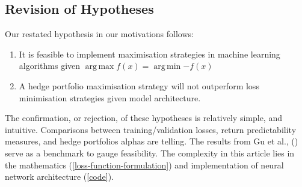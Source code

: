 \documentclass[12pt]{article}
\DeclareMathOperator*{\argmax}{arg\,max}
\DeclareMathOperator*{\argmin}{arg\,min} %
\begin{document}
\subsection{Revision of Hypotheses}
Our restated hypothesis in our motivations follows:
\singlespacing
\begin{enumerate}
	\item It is feasible to implement maximisation strategies in machine learning algorithms given $\argmax{f(x)}=\argmin{-f(x)}$
	\item A hedge portfolio maximisation strategy will not outperform loss minimisation strategies given model architecture.
\end{enumerate}
\doublespacing
The confirmation, or rejection, of these hypotheses is relatively simple, and intuitive. 
Comparisons between training/validation losses, return predictability measures, and hedge portfolios alphas are telling. 
The results from Gu et al., (\citeyear{eapvml}) serve as a benchmark to gauge feasibility.
The complexity in this article lies in the mathematics (\ref{loss-function-formulation}) and implementation of neural network architecture (\ref{code}).
\newpage
\end{document}
